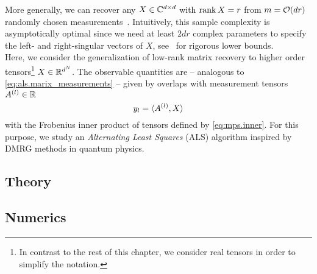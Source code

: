 More generally, we can recover any $X \in {\mathbb{C}}^{d \times d}$ with $\operatorname{rank} X = r$ from $m = {\mathcal{O}}(d r)$ randomly chosen measurements~\cite{Candes_2011_Tight,Kueng_2014_Low}.
Intuitively, this sample complexity is asymptotically optimal since we need at least $2 d r$ complex parameters to specify the left- and right-singular vectors of $X$, see~\cite{Eldar_2012_Uniqueness,Li_2017_Optimal} for rigorous lower bounds.\\


Here, we consider the generalization of low-rank matrix recovery to higher order tensors\footnote{%
  In contrast to the rest of this chapter, we consider real tensors in order to simplify the notation.
}
$X \in {\mathbb{R}}^{d^N}$.
The observable quantities are -- analogous to \cref{eq:als.marix_measurements} -- given by overlaps with measurement tensors $A^{(l)} \in {\mathbb{R}}$
\[
  y_l = \braket{A^{(l)}, X}
  \label{eq:als.tensor_measurements}
\]
with the Frobenius inner product of tensors defined by \cref{eq:mps.inner}.
For this purpose, we study an \emph{Alternating Least Squares} (ALS) algorithm inspired by DMRG methods in quantum physics.


%

\subsection{Theory}%
\subsection{Numerics}%

